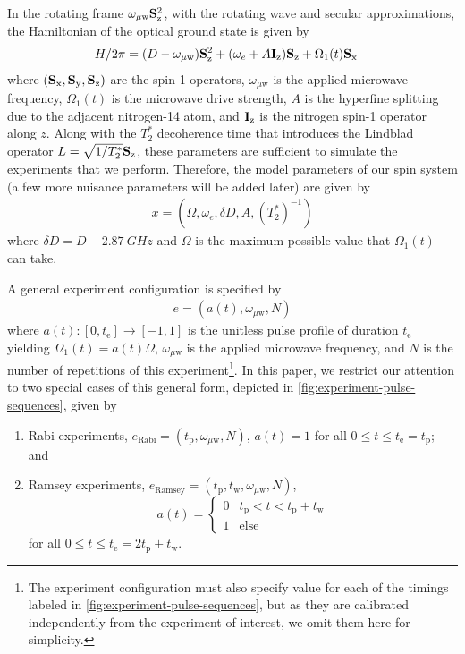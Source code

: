 \documentclass[aps,nofootinbib,twocolumn,superscriptaddress]{revtex4}
\newcommand{\mps}{x}
\newcommand{\eps}{e}
\newcommand{\Rabi}{\text{Rabi}}
\newcommand{\Ramsey}{\text{Ramsey}}
\newcommand{\te}{t_\text{e}}
\newcommand{\tp}{t_\text{p}}
\newcommand{\tw}{t_\text{w}}
\renewcommand{\H}{H}    %
\renewcommand{\L}{L}    %
\newcommand{\uw}{{\mu\text{w}}}
\begin{document}
In the rotating frame $\omega_\uw \Sz^2$, 
with the rotating wave and secular approximations,
the Hamiltonian of the optical ground state is given by
\begin{align}
    \H/2\pi &= (D-\omega_\uw)\Sz^2 + (\omega_e+A \Iz)\Sz + \Omega_1(t)\Sx
\end{align}
where $(\mathbf{S}_{\text{x}},\mathbf{S}_{\text{y}},\mathbf{S}_{\text{z}})$ are the spin-1 operators, $\omega_\uw$ is the applied
microwave frequency, $\Omega_1(t)$ is the microwave drive strength, $A$ is
the hyperfine splitting  due to the adjacent nitrogen-14 atom, and $\mathbf{I}_{\text{z}}$
is the nitrogen spin-1 operator along $z$.
Along with the $T_2^*$ decoherence time that introduces the 
Lindblad operator $\L=\sqrt{1/T_2^*}\Sz$, these parameters are sufficient
to simulate the experiments that we perform.
Therefore, the model parameters of our spin system (a few
more nuisance parameters will be added later) are given by
\begin{align}
    \mps=(\Omega,\omega_e,\delta D,A,(T_2^*)^{-1})
\end{align}
where $\delta D=D-\SI{2.87}{GHz}$ and $\Omega$ is the maximum possible
value that $\Omega_1(t)$ can take.

A general experiment configuration is specified by
\begin{align}
    \eps=(a(t), \omega_\uw, N)
\end{align}
where $a(t):[0,\te]\rightarrow [-1,1]$ is the 
unitless pulse profile of duration $\te$ 
yielding $\Omega_1(t)=a(t)\Omega$,
$\omega_\uw$ is the applied microwave frequency,
and $N$ is the number of repetitions of this experiment\footnote{The
experiment configuration must also specify value for each of the timings
labeled in \autoref{fig:experiment-pulse-sequences}, but as they are
calibrated independently from the experiment of interest, we omit
them here for simplicity.}.
In this paper, we restrict our attention to two special
cases of this general form, depicted in 
\autoref{fig:experiment-pulse-sequences}, given by
\begin{enumerate}
    \item Rabi experiments, $\eps_\Rabi=(\tp,\omega_\uw, N)$, 
    $a(t)=1$ for all $0\leq t\leq \te=\tp$; and
    \item Ramsey experiments, $\eps_\Ramsey=(\tp,\tw,\omega_\uw, N)$, 
    \begin{equation*}
        a(t)=\begin{cases}
            0 & \tp<t<\tp+\tw\\
            1 & \text{else}
        \end{cases}
    \end{equation*}
    for all $0\leq t\leq \te=2\tp+\tw$.
\end{enumerate}
\end{document}
